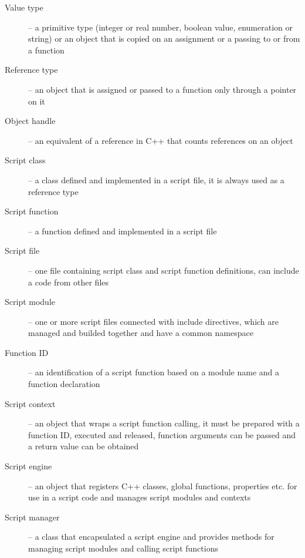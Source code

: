 \begin{description}
  \item[Value type] -- a primitive type (integer or real number, boolean value, enumeration or string) or an object that is copied on an assignment or a passing to or from a function
  \item[Reference type] -- an object that is assigned or passed to a function only through a pointer on it
  \item[Object handle] -- an equivalent of a reference in C++ that counts references on an object
	\item[Script class] -- a class defined and implemented in a script file, it is always used as a reference type
	\item[Script function] -- a function defined and implemented in a script file
	\item[Script file] -- one file containing script class and script function definitions, can include a code from other files
	\item[Script module] -- one or more script files connected with include directives, which are managed and builded together and have a common namespace
	\item[Function ID] -- an identification of a script function based on a module name and a function declaration
	\item[Script context] -- an object that wraps a script function calling, it must be prepared with a function ID, executed and released, function arguments can be passed and a return value can be obtained
	\item[Script engine] -- an object that registers C++ classes, global functions, properties etc. for use in a script code and manages script modules and contexts
	\item[Script manager] -- a class that encapsulated a script engine and provides methods for managing script modules and calling script functions
\end{description}